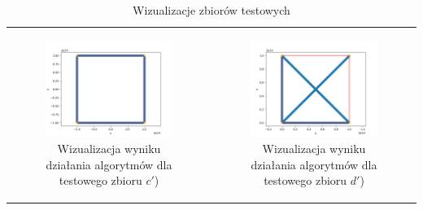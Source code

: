 \documentclass[a4paper]{article}
\begin{document}
\begin{table}[H]
\begin{tabular}{cc}
        \begin{subfigure}{0.5\textwidth}
            \includegraphics[width=\columnwidth]{tests/graham/graham_points_c_test.png}
            \caption{Wizualizacja wyniku działania algorytmów dla testowego zbioru $c'$)}
            \label{fig:points_c_test}
        \end{subfigure} & 
        \begin{subfigure}{0.5\textwidth}
            \includegraphics[width=\columnwidth]{tests/graham/graham_points_d_test.png}
            \caption{Wizualizacja wyniku działania algorytmów dla testowego zbioru $d'$)}
            \label{fig:points_d_test}
        \end{subfigure} \\
    
    \end{tabular}
    \caption{Wizualizacje zbiorów testowych}
    \label{tab:wiz_testy}
\end{table}
\end{document}
